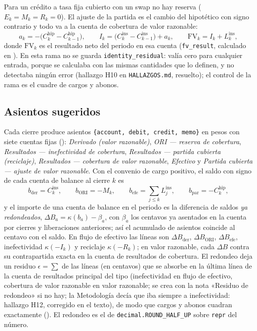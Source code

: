 Para un crédito a tasa fija cubierto con un swap no hay reserva ($E_k=M_k=R_k=0$). El ajuste de la partida es el cambio
del hipotético con signo contrario y todo va a la cuenta de cobertura de valor razonable:
\begin{equation}\label{eq:cap10-vr}
  a_k = -\bigl(C^{\mathrm{hip}}_k - C^{\mathrm{hip}}_{k-1}\bigr), \qquad
  I_k = \bigl(C^{\mathrm{ins}}_k - C^{\mathrm{ins}}_{k-1}\bigr) + a_k, \qquad
  \mathrm{FV}_k = I_k + L^{\mathrm{ins}}_k ,
\end{equation}
donde $\mathrm{FV}_k$ es el resultado neto del periodo en esa cuenta (\texttt{fv\_result}, calculado en ). En esta rama no se guarda
\texttt{identity\_residual}: valía cero para cualquier entrada, porque se calculaba con las mismas cantidades que lo
definen, y no detectaba ningún error (hallazgo H10 en \texttt{HALLAZGOS.md}, resuelto); el control de la rama es el
cuadre de cargos y abonos.

\subsection{Asientos sugeridos}\label{sec:cap10-asientos}

Cada cierre produce asientos \texttt{\{account, debit, credit, memo\}} en pesos con siete cuentas fijas
(): \emph{Derivado (valor razonable)}, \emph{ORI --- reserva de cobertura},
\emph{Resultados --- inefectividad de cobertura}, \emph{Resultados --- partida cubierta (reciclaje)},
\emph{Resultados --- cobertura de valor razonable}, \emph{Efectivo} y \emph{Partida cubierta --- ajuste de valor razonable}.
Con el convenio de cargo positivo, el saldo con signo de cada cuenta de balance al cierre $k$ es
\begin{equation}\label{eq:cap10-saldos}
  b_{\mathrm{der}} = C^{\mathrm{ins}}_k, \qquad
  b_{\mathrm{ORI}} = -M_k, \qquad
  b_{\mathrm{efe}} = \sum_{j\le k} L^{\mathrm{ins}}_j, \qquad
  b_{\mathrm{par}} = -C^{\mathrm{hip}}_k ,
\end{equation}
y el importe de una cuenta de balance en el periodo es la diferencia de saldos \emph{ya redondeados},
$\Delta B_a = \kappa(b_a) - \beta_a$, con $\beta_a$ los centavos ya asentados en la cuenta por cierres y liberaciones
anteriores; así el acumulado de asientos coincide al centavo con el saldo. En flujo de efectivo las líneas son
$\Delta B_{\mathrm{der}}$, $\Delta B_{\mathrm{ORI}}$, $\Delta B_{\mathrm{efe}}$, inefectividad $\kappa(-I_k)$ y reciclaje
$\kappa(-R_k)$; en valor razonable, cada $\Delta B$ contra su contrapartida exacta en la cuenta de resultados de cobertura.
El redondeo deja un residuo $\epsilon=\sum$ de las líneas (en centavos) que se absorbe en la última línea de la cuenta
de resultados principal del tipo (inefectividad en flujo de efectivo, cobertura de valor razonable en valor razonable;
se crea con la nota «Residuo de redondeo» si no hay; la Metodología decía que iba siempre a inefectividad: hallazgo H12, corregido en el texto), de modo que cargos y abonos cuadran exactamente
(). El redondeo es el de \texttt{decimal.ROUND\_HALF\_UP} sobre
\texttt{repr} del número.

